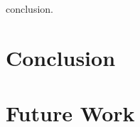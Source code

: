 \hspace{24pt}

conclusion.

\section{Conclusion} \label{sec:conclusion}

\section{Future Work} \label{sec:future_work}

